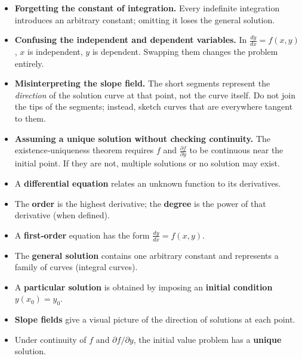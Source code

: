 \documentclass[11pt]{article}
\newcounter{popsec}
\newcounter{popsub}
\newcommand{\courssub}[1]{%
  \stepcounter{popsub}%
  \par\vspace{9pt}\noindent{\popxbold\fontsize{11.5}{13}\selectfont\color{popink}{\color{poporange}\thepopsec.\thepopsub}\hspace{6pt}#1}\par\nopagebreak\vspace{4pt}
}
\begin{document}
\begin{attention}
\begin{itemize}
\item \textbf{Forgetting the constant of integration.} Every indefinite integration introduces an arbitrary constant; omitting it loses the general solution.
\item \textbf{Confusing the independent and dependent variables.} In \(\frac{dy}{dx}=f(x,y)\), \(x\) is independent, \(y\) is dependent. Swapping them changes the problem entirely.
\item \textbf{Misinterpreting the slope field.} The short segments represent the \emph{direction} of the solution curve at that point, not the curve itself. Do not join the tips of the segments; instead, sketch curves that are everywhere tangent to them.
\item \textbf{Assuming a unique solution without checking continuity.} The existence‑uniqueness theorem requires \(f\) and \(\frac{\partial f}{\partial y}\) to be continuous near the initial point. If they are not, multiple solutions or no solution may exist.
\end{itemize}
\end{attention}

\courssub{Summary of Key Points}

\begin{aretenir}
\begin{itemize}
\item A \textbf{differential equation} relates an unknown function to its derivatives.
\item The \textbf{order} is the highest derivative; the \textbf{degree} is the power of that derivative (when defined).
\item A \textbf{first‑order} equation has the form \(\frac{dy}{dx}=f(x,y)\).
\item The \textbf{general solution} contains one arbitrary constant and represents a family of curves (integral curves).
\item A \textbf{particular solution} is obtained by imposing an \textbf{initial condition} \(y(x_0)=y_0\).
\item \textbf{Slope fields} give a visual picture of the direction of solutions at each point.
\item Under continuity of \(f\) and \(\partial f/\partial y\), the initial value problem has a \textbf{unique} solution.
\end{itemize}
\end{aretenir}
\end{document}
